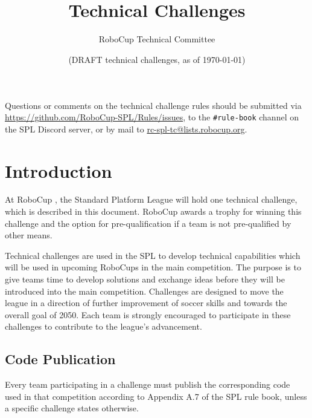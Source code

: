 \documentclass[12pt]{article}
\title{\leaguename\\Technical Challenges}
\author{RoboCup Technical Committee}
\date{(DRAFT \RCYear technical challenges, as of \today)}
\begin{document}
\maketitle

\begin{center}
Questions or comments on the technical challenge rules should be submitted via \url{https://github.com/RoboCup-SPL/Rules/issues}, to the \texttt{\#rule-book} channel on the SPL Discord server, or by mail to \url{rc-spl-tc@lists.robocup.org}.
\end{center}

\newpage

\tableofcontents
\setcounter{tocdepth}{3}

\thispagestyle{fancy}

\clearpage

\cfoot{\thepage}
\setcounter{page}{1}

\section{Introduction}
At RoboCup \RCYear, the Standard Platform League will hold one technical challenge, which is described in this document.
RoboCup \RCYear awards a trophy for winning this challenge and the option for pre-qualification if a team is not pre-qualified by other means.

Technical challenges are used in the SPL to develop technical capabilities which will be used in upcoming RoboCups in the main competition. The purpose is to give teams time to develop solutions and exchange ideas before they will be introduced into the main competition. Challenges are designed to move the league in a direction of further improvement of soccer skills and towards the overall goal of 2050. Each team is strongly encouraged to participate in these challenges to contribute to the league's advancement.

\subsection{Code Publication}
Every team participating in a challenge must publish the corresponding code used in that competition according to Appendix A.7 of the SPL rule book, unless a specific challenge states otherwise.



\end{document}
